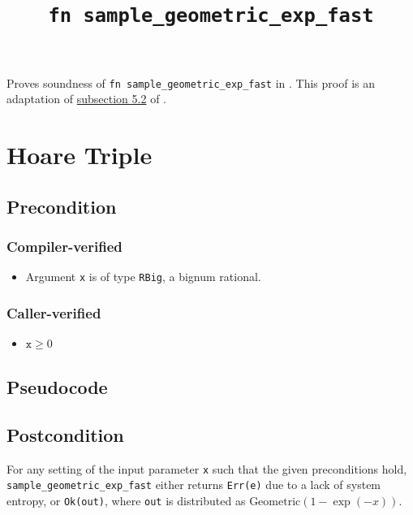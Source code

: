 \documentclass{article}
\title{\texttt{fn sample\_geometric\_exp\_fast}}
\author{\MichaelShoemateAuthor}
\begin{document}
\maketitle

Proves soundness of \texttt{fn sample\_geometric\_exp\_fast} in .
This proof is an adaptation of \href{https://arxiv.org/pdf/2004.00010.pdf#subsection.5.2}{subsection 5.2} of \cite{CKS20}.

\section{Hoare Triple}

\subsection*{Precondition}
\subsubsection*{Compiler-verified}
\begin{itemize}
    \item Argument \texttt{x} is of type \texttt{RBig}, a bignum rational.
\end{itemize}

\subsubsection*{Caller-verified}
\begin{itemize}
    \item $\texttt{x} \geq 0$
\end{itemize}

\subsection*{Pseudocode}


\subsection*{Postcondition}
\begin{theorem}
\label{postcondition}
For any setting of the input parameter \texttt{x} such that the given preconditions hold, \\
\texttt{sample\_geometric\_exp\_fast} either returns \texttt{Err(e)} due to a lack of system entropy,
or \texttt{Ok(out)}, where \texttt{out} is distributed as $\textrm{Geometric}(1 - \exp(-x))$.
\end{theorem}
\end{document}
